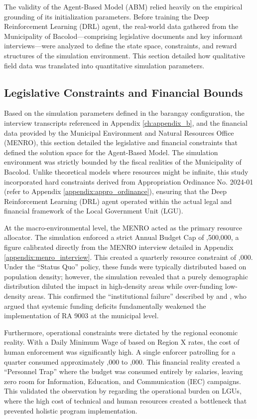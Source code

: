 The validity of the Agent-Based Model (ABM) relied heavily on the empirical grounding of its initialization parameters. Before training the Deep Reinforcement Learning (DRL) agent, the real-world data gathered from the Municipality of Bacolod—comprising legislative documents and key informant interviews—were analyzed to define the state space, constraints, and reward structures of the simulation environment. This section detailed how qualitative field data was translated into quantitative simulation parameters.

\subsection{Legislative Constraints and Financial Bounds}
Based on the simulation parameters defined in the barangay configuration, the interview transcripts referenced in Appendix \ref{ch:appendix_b}, and the financial data provided by the Municipal Environment and Natural Resources Office (MENRO), this section detailed the legislative and financial constraints that defined the solution space for the Agent-Based Model. The simulation environment was strictly bounded by the fiscal realities of the Municipality of Bacolod. Unlike theoretical models where resources might be infinite, this study incorporated hard constraints derived from Appropriation Ordinance No. 2024-01 (refer to Appendix \ref{appendix:appro_ordinance}), ensuring that the Deep Reinforcement Learning (DRL) agent operated within the actual legal and financial framework of the Local Government Unit (LGU).

At the macro-environmental level, the MENRO acted as the primary resource allocator. The simulation enforced a strict Annual Budget Cap of ,500,000, a figure calibrated directly from the MENRO interview detailed in Appendix \ref{appendix:menro_interview}. This created a quarterly resource constraint of ,000. Under the ``Status Quo'' policy, these funds were typically distributed based on population density; however, the simulation revealed that a purely demographic distribution diluted the impact in high-density areas while over-funding low-density areas. This confirmed the ``institutional failure'' described by \cite{Ibanez2022} and \cite{Santos2025}, who argued that systemic funding deficits fundamentally weakened the implementation of RA 9003 at the municipal level.

Furthermore, operational constraints were dictated by the regional economic reality. With a Daily Minimum Wage of  based on Region X rates, the cost of human enforcement was significantly high. A single enforcer patrolling for a quarter consumed approximately ,000 to ,000. This financial reality created a ``Personnel Trap'' where the budget was consumed entirely by salaries, leaving zero room for Information, Education, and Communication (IEC) campaigns. This validated the observation by \cite{Nishimura2022} regarding the operational burden on LGUs, where the high cost of technical and human resources created a bottleneck that prevented holistic program implementation.

